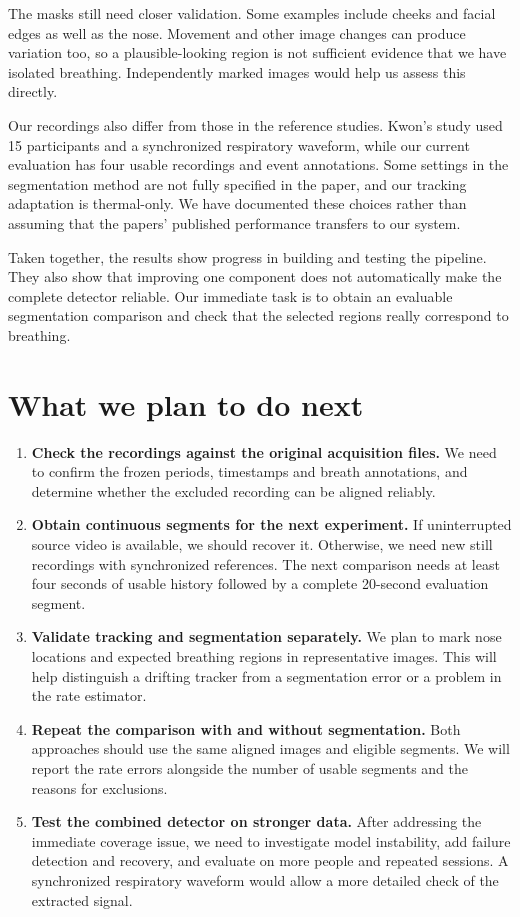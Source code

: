 \documentclass[11pt,a4paper]{article}
\begin{document}
The masks still need closer validation. Some examples include cheeks and facial edges as well as the nose. Movement and other image changes can produce variation too, so a plausible-looking region is not sufficient evidence that we have isolated breathing. Independently marked images would help us assess this directly.

Our recordings also differ from those in the reference studies. Kwon's study used 15 participants and a synchronized respiratory waveform, while our current evaluation has four usable recordings and event annotations. Some settings in the segmentation method are not fully specified in the paper, and our tracking adaptation is thermal-only. We have documented these choices rather than assuming that the papers' published performance transfers to our system.

Taken together, the results show progress in building and testing the pipeline. They also show that improving one component does not automatically make the complete detector reliable. Our immediate task is to obtain an evaluable segmentation comparison and check that the selected regions really correspond to breathing.

\section{What we plan to do next}
\begin{enumerate}
\item \textbf{Check the recordings against the original acquisition files.}
We need to confirm the frozen periods, timestamps and breath annotations, and determine whether the excluded recording can be aligned reliably.

\item \textbf{Obtain continuous segments for the next experiment.}
If uninterrupted source video is available, we should recover it. Otherwise, we need new still recordings with synchronized references. The next comparison needs at least four seconds of usable history followed by a complete 20-second evaluation segment.

\item \textbf{Validate tracking and segmentation separately.}
We plan to mark nose locations and expected breathing regions in representative images. This will help distinguish a drifting tracker from a segmentation error or a problem in the rate estimator.

\item \textbf{Repeat the comparison with and without segmentation.}
Both approaches should use the same aligned images and eligible segments. We will report the rate errors alongside the number of usable segments and the reasons for exclusions.

\item \textbf{Test the combined detector on stronger data.}
After addressing the immediate coverage issue, we need to investigate model instability, add failure detection and recovery, and evaluate on more people and repeated sessions. A synchronized respiratory waveform would allow a more detailed check of the extracted signal.
\end{enumerate}
\end{document}
